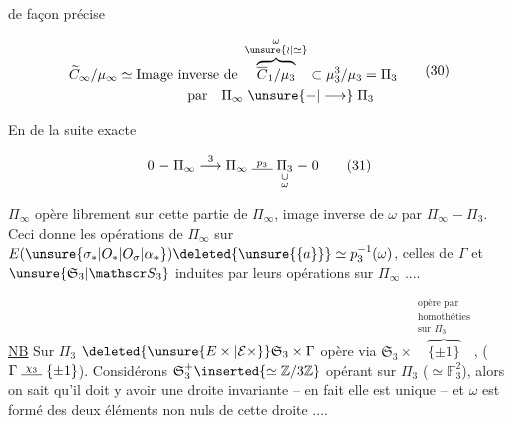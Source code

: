 
de façon précise

\[
\begin{aligned}
\widetilde C_\infty/\mu_\infty&\simeq\text{Image inverse de }\overbrace{\overline C_1/\mu_3}^{\substack{\omega\\\unsure{\wr|\simeq}}}\subset\mu_3^3/\mu_3=\Pi_3\\
&\hspace{5em}\text{par}\quad\Pi_\infty\mathrel{\unsure{-|\longrightarrow}}\Pi_3
\end{aligned}\tag*{(30)}
\]

En  de la suite exacte

\[
0\mathrel{-}\Pi_\infty\mathrel{\overset{3}{\longrightarrow}}\Pi_\infty
\mathrel{\overset{p_3}{\rule{1.5em}{0.4pt}}}
\underset{\substack{\cup\\\omega}}{\Pi_3}\mathrel{-}0
\tag*{(31)}
\]

$\Pi_\infty$ opère librement sur cette partie de $\Pi_\infty$, image inverse de $\omega$ par $\Pi_\infty\mathrel{-}\Pi_3$. Ceci donne les opérations de $\Pi_\infty$ sur $E(\unsure{\sigma_*|O_*|O_{\sigma}|\alpha_*})\deleted{\unsure{\{a\}}}\simeq p_3^{-1}(\omega)$, celles de $\Gamma$ et $\unsure{\mathfrak S_3|\mathscr S_3}$  induites par leurs opérations sur $\Pi_\infty$ ....

\uline{NB} Sur $\Pi_3$ $\deleted{\unsure{E\times|\mathcal E\times}}\mathfrak S_3\times\Gamma$ opère via $\mathfrak S_3\times\overbrace{\{\pm1\}}^{\substack{\text{opère par}\\\text{homothéties}\\\text{sur }\Pi_3}}$, ($\Gamma\mathrel{\overset{\chi_3}{\rule{1.5em}{0.4pt}}}\{\pm1\}$). Considérons $\mathfrak S_3^+\inserted{\simeq\mathbb Z/3\mathbb Z}$ opérant sur $\Pi_3$ ($\simeq\mathbb F_3^2$), alors on sait qu'il doit y avoir une droite invariante --  en fait elle est unique -- et $\omega$ est formé des deux éléments non nuls de cette droite ....

